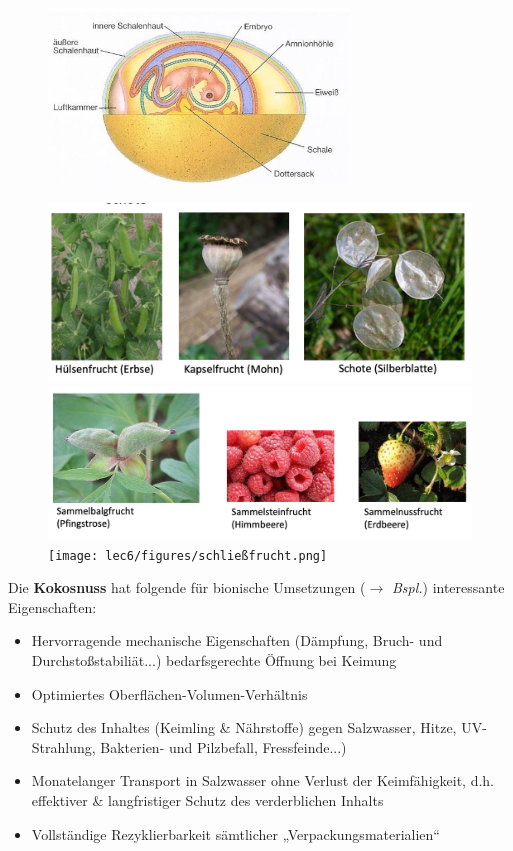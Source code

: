 \begin{figure}[!h]
  \centering
  \includegraphics[width=8cm]{lec6/figures/ei.png}
  \hfill
  \begin{minipage}{.5\linewidth}
    \centering
      \includegraphics[width=\linewidth]{lec6/figures/streufrucht.png}
      \includegraphics[width=\linewidth]{lec6/figures/sammelfrucht.png}
      \texttt{[image: lec6/figures/schließfrucht.png]}
  \end{minipage}\quad
\end{figure}
Die \textbf{Kokosnuss} hat folgende für bionische Umsetzungen (\dangersign $\rightarrow$ \textit{Bspl.}) interessante Eigenschaften:

\begin{itemize}
    \item Hervorragende mechanische Eigenschaften (Dämpfung, Bruch- und Durchstoßstabiliät...) bedarfsgerechte Öffnung bei Keimung
    \item Optimiertes Oberflächen-Volumen-Verhältnis
    \item Schutz des Inhaltes (Keimling \& Nährstoffe) gegen Salzwasser, Hitze, UV-Strahlung, Bakterien- und Pilzbefall, Fressfeinde...)
    \item Monatelanger Transport in Salzwasser ohne Verlust der Keimfähigkeit, d.h. effektiver \& langfristiger Schutz des verderblichen Inhalts
    \item Vollständige Rezyklierbarkeit sämtlicher „Verpackungsmaterialien“
\end{itemize}

